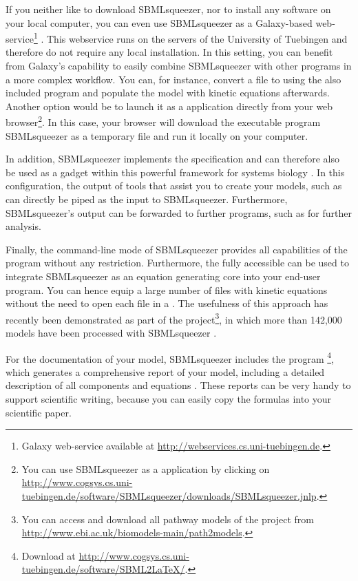 If you neither like to download SBMLsqueezer, nor to install any software on
your local computer, you can even use SBMLsqueezer as a Galaxy-based
web-service\footnote{Galaxy web-service available at \url{http://webservices.cs.uni-tuebingen.de}.} \citet{Goecks2010}.
This webservice runs on the servers of the University of Tuebingen and therefore do not require any local installation.
In this setting, you can benefit from Galaxy's capability to easily combine SBMLsqueezer with other programs in a more complex workflow. You can, for instance, convert a \BioPAX file to \SBML using the also included program \BioPAXSBML \citep{Buechel2012a} and populate the model with kinetic equations afterwards.
Another option would be to launch it as a \JavaWebStart application directly from your web
browser\footnote{You can use SBMLsqueezer as a \JavaWebStart application by
clicking on \url{http://www.cogsys.cs.uni-tuebingen.de/software/SBMLsqueezer/downloads/SBMLsqueezer.jnlp}.}.
In this case, your browser will download the executable program SBMLsqueezer as a temporary file and run it locally on your computer.

In addition, SBMLsqueezer implements the \Garuda specification and can therefore
also be used as a gadget within this powerful framework for systems biology
\citep{Ghosh2011}. In this configuration, the output of tools that assist you
to create your models, such as \KEGGtranslator \citep{Wrzodek2011, Wrzodek2013}
can directly be piped as the input to SBMLsqueezer. Furthermore, SBMLsqueezer's
output can be forwarded to further programs, such as \SBMLsimulator
\citep{Keller2013, Keller2014} for further analysis.

Finally, the command-line mode of SBMLsqueezer provides all capabilities of the
program without any restriction.
Furthermore, the fully accessible \API can be used
to integrate SBMLsqueezer as an equation generating core into your end-user
program.
You can hence equip a large number of files with kinetic equations without the
need to open each file in a \GUI.
The usefulness of this approach has recently been demonstrated as part of the
\pathmodels project\footnote{You can access and download all pathway models of
the \pathmodels project from \url{http://www.ebi.ac.uk/biomodels-main/path2models}.},
in which more than 142,000 \SBML models have been processed with SBMLsqueezer
\citep{Buechel2013}.

For the documentation of your model, SBMLsqueezer includes the program
\SBMLLaTeX\footnote{Download \SBMLLaTeX at \url{http://www.cogsys.cs.uni-tuebingen.de/software/SBML2LaTeX/}.},
which generates a comprehensive report of your model, including a detailed
description of all components and equations \citep{Draeger2009b, Draeger2010a}.
These reports can be very handy to support scientific writing, because you can
easily copy the formulas into your scientific paper.

